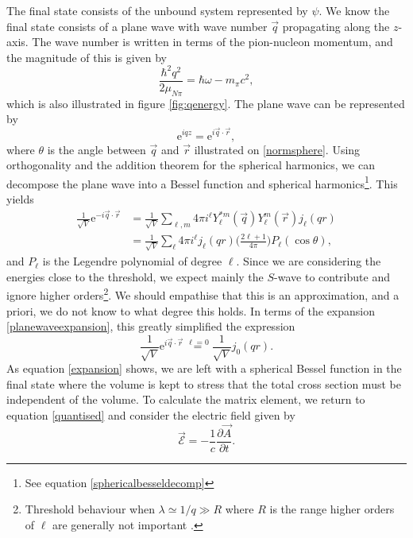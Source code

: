 The final state consists of the unbound system represented by $\psi$. We know the final state consists of a plane wave with wave number $\vec{q}$ propagating along the $z$-axis. The wave number  is written in terms of the pion-nucleon momentum, and the magnitude of this is given by
\begin{equation}\label{key}
	\frac{\hbar^2 q^2}{2\mu_{N\pi}}=\hbar \omega-m_\pi c^2,
\end{equation}
which is also illustrated in figure \ref{fig:qenergy}. The plane wave can be represented by 
\begin{equation} \label{key}
	\text{e}^{iqz} = \text{e}^{i \vec{q}\cdot \vec{r}},
\end{equation}
where $\theta$ is the angle between $\vec{q}$ and $\vec{r}$ illustrated on \ref{normsphere}. Using orthogonality and the addition theorem for the spherical harmonics, we can decompose the plane wave into a Bessel function and spherical harmonics\footnote{See equation \eqref{sphericalbesseldecomp}}. This yields
\begin{align}\label{planewaveexpansion}
	\frac{1}{\sqrt{V}} \text{e}^{-i\vec{q}\cdot\vec{r}} &= \frac{1}{\sqrt{V}} \sum_{\ell,m} 4\pi i^\ell Y_\ell^{*m}(\vec{q})Y_\ell^m(\vec{r})j_\ell(qr) \\
	&= \frac{1}{\sqrt{V}} \sum_\ell 4\pi i^\ell j_\ell(qr) \bigg( \frac{2\ell+1}{4\pi}\bigg)P_\ell(\cos\theta),
\end{align}
and $P_\ell$ is the Legendre polynomial of degree $\ell$. Since we are considering the energies close to the threshold, we expect mainly the $S$-wave to contribute and ignore higher orders\footnote{Threshold behaviour when $\lambda\simeq1/q\gg R$ where $R$ is the range higher orders of $\ell$ are generally not important \cite{Sakurai}.}. We should empathise that this is an approximation, and a priori, we do not know to what degree this holds. In terms of the expansion \eqref{planewaveexpansion}, this greatly simplified the expression
\begin{equation} \label{expansion}
	\frac{1}{\sqrt{V}}\text{e}^{i\vec{q}\cdot \vec{r}} \stackrel{\ell=0}{=} \frac{1}{\sqrt{V}}j_0(qr).
\end{equation}
As equation \eqref{expansion} shows, we are left with a spherical Bessel function in the final state where the volume is kept to stress that the total cross section must be independent of the volume. To calculate the matrix element, we return to equation \eqref{quantised} and consider the electric field given by
\begin{equation}\label{EF}
	\vec{\mathcal{E}} = -\frac{1}{c} \frac{\partial \vec{A}}{\partial t}.
\end{equation}
